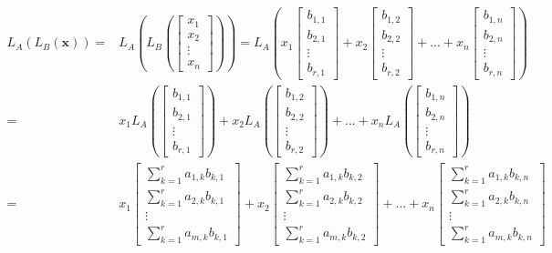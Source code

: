 \documentclass{article}
\begin{document}
\begin{align*} 
L_A(L_B(\mathbf{x})) = & 
L_A\left(L_B\left(\begin{bmatrix} x_1 \\ x_2 \\ \vdots \\ x_n \end{bmatrix}\right)\right) 
= L_A\left(x_1\begin{bmatrix} b_{1,1} \\ b_{2,1} \\ \vdots \\ b_{r,1} \end{bmatrix} 
+ x_2\begin{bmatrix} b_{1,2} \\ b_{2,2} \\ \vdots \\ b_{r,2} \end{bmatrix}
+ ... + x_n\begin{bmatrix} b_{1,n} \\ b_{2,n} \\ \vdots \\ b_{r,n} \end{bmatrix}\right) \\
= & x_1 L_A\left(\begin{bmatrix} b_{1,1} \\ b_{2,1} \\ \vdots \\ b_{r,1} \end{bmatrix}\right) 
+ x_2 L_A\left(\begin{bmatrix} b_{1,2} \\ b_{2,2} \\ \vdots \\ b_{r,2} \end{bmatrix}\right) 
+ ... + x_n L_A\left(\begin{bmatrix} b_{1,n} \\ b_{2,n} \\ \vdots \\ b_{r,n} \end{bmatrix}\right) \\ 
= & x_1 \begin{bmatrix} \sum_{k = 1}^r a_{1,k}b_{k,1} \\ \sum_{k = 1}^r a_{2,k}b_{k,1} \\ \vdots \\ \sum_{k = 1}^r a_{m,k}b_{k,1} \end{bmatrix} 
+ x_2 \begin{bmatrix} \sum_{k = 1}^r a_{1,k}b_{k,2} \\ \sum_{k = 1}^r a_{2,k}b_{k,2} \\ \vdots \\ \sum_{k = 1}^r a_{m,k}b_{k,2} \end{bmatrix} 
+ ... + x_n \begin{bmatrix} \sum_{k = 1}^r a_{1,k}b_{k,n} \\ \sum_{k = 1}^r a_{2,k}b_{k,n} \\ \vdots \\ \sum_{k = 1}^r a_{m,k}b_{k,n} \end{bmatrix} 
\end{align*} 
\end{document}
